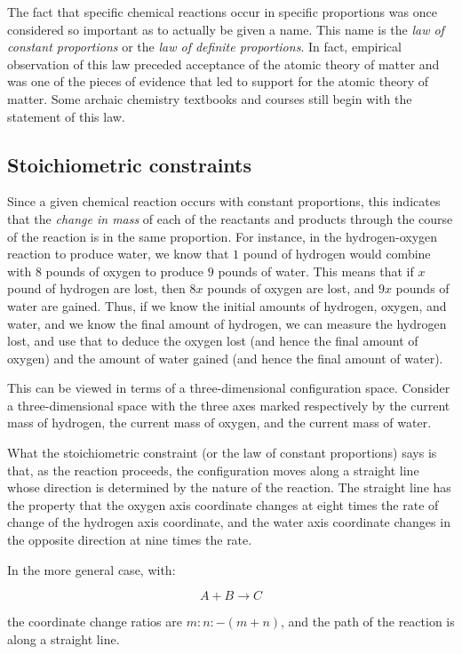 \documentclass{amsart}
\begin{document}
The fact that specific chemical reactions occur in specific
proportions was once considered so important as to actually be given a
name. This name is the {\em law of constant proportions} or the {\em
law of definite proportions}. In fact, empirical observation of this
law preceded acceptance of the atomic theory of matter and was one of
the pieces of evidence that led to support for the atomic theory of
matter. Some archaic chemistry textbooks and courses still begin with
the statement of this law.

\subsection{Stoichiometric constraints}

Since a given chemical reaction occurs with constant proportions, this
indicates that the {\em change in mass} of each of the reactants and
products through the course of the reaction is in the same
proportion. For instance, in the hydrogen-oxygen reaction to produce
water, we know that $1$ pound of hydrogen would combine with $8$
pounds of oxygen to produce $9$ pounds of water. This means that if
$x$ pound of hydrogen are lost, then $8x$ pounds of oxygen are lost,
and $9x$ pounds of water are gained. Thus, if we know the initial
amounts of hydrogen, oxygen, and water, and we know the final amount
of hydrogen, we can measure the hydrogen lost, and use that to deduce
the oxygen lost (and hence the final amount of oxygen) and the amount
of water gained (and hence the final amount of water).

This can be viewed in terms of a three-dimensional configuration
space. Consider a three-dimensional space with the three axes marked
respectively by the current mass of hydrogen, the current mass of
oxygen, and the current mass of water.

What the stoichiometric constraint (or the law of constant
proportions) says is that, as the reaction proceeds, the configuration
moves along a straight line whose direction is determined by the
nature of the reaction. The straight line has the property that the
oxygen axis coordinate changes at eight times the rate of change of
the hydrogen axis coordinate, and the water axis coordinate changes in
the opposite direction at nine times the rate.

In the more general case, with:

$$A + B \to C$$

the coordinate change ratios are $m:n:-(m + n)$, and the path of the
reaction is along a straight line.
\end{document}
